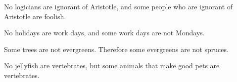 \begin{exercises}


\item No logicians are ignorant of Aristotle, and some people who are ignorant of Aristotle are foolish.


\item No holidays are work days, and some work days are not Mondays.

\item Some trees are not evergreens. Therefore some evergreens are not spruces.





\item No jellyfish are vertebrates, but some animals that make good pets are vertebrates.
%


\end{exercises}

